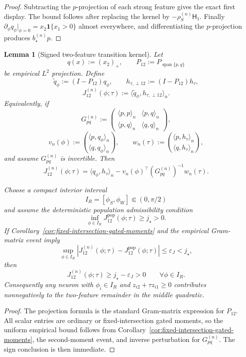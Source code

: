 \documentclass{article} %
\theoremstyle{plain}
\newtheorem{lemma}[theorem]{Lemma}
\theoremstyle{definition}
\theoremstyle{remark}
\begin{document}
\begin{proof}
Subtracting the $p$-projection of each strong feature gives the exact first
display.  The bound follows after replacing the kernel by
$-\rho_S^{(n)}\mathsf H_1$.  Finally
$\partial_\phi q_\phi|_{\phi=0}=x_2\mathbf 1\{x_1>0\}$ almost everywhere,
and differentiating the $p$-projection produces $b_\star^{(n)}p$.
\end{proof}

\begin{lemma}[Signed two-feature transition kernel]
\label{lem:signed-two-feature-transition-kernel}
Let
\[
q(x):=(x_2)_+,
\qquad
P_{12}:=P_{\operatorname{span}\{p,q\}}
\]
be empirical $L^2$ projection.  Define
\[
\widetilde q_\phi:=(I-P_{12})q_\phi,
\qquad
h_{\tau,\perp12}:=(I-P_{12})h_\tau,
\]
\[
\boxed{
J_{12}^{(n)}(\phi;\tau)
:=
\langle\widetilde q_\phi,h_{\tau,\perp12}\rangle_n.
}
\tag{J12-emp}\label{eq:J12-emp}
\]
Equivalently, if
\[
G_{pq}^{(n)}
:=
\begin{pmatrix}
\langle p,p\rangle_n&\langle p,q\rangle_n\\
\langle p,q\rangle_n&\langle q,q\rangle_n
\end{pmatrix},
\]
\[
v_n(\phi)
:=
\binom{\langle p,q_\phi\rangle_n}{\langle q,q_\phi\rangle_n},
\qquad
w_n(\tau)
:=
\binom{\langle p,h_\tau\rangle_n}{\langle q,h_\tau\rangle_n},
\]
and assume $G_{pq}^{(n)}$ is invertible. Then
\[
\boxed{
J_{12}^{(n)}(\phi;\tau)
=
\langle q_\phi,h_\tau\rangle_n
-v_n(\phi)^\top(G_{pq}^{(n)})^{-1}w_n(\tau).
}
\tag{J12-moment-form}\label{eq:J12-moment-form}
\]

Choose a compact interior interval
\[
I_R=[\phi_S,\phi_W]\Subset(0,\pi/2)
\]
and assume the deterministic population admissibility condition
\[
\boxed{
\inf_{\phi\in I_R}
J_{12}^{\mathrm{pop}}(\phi;\tau)
\ge j_\star>0.
}
\tag{J-adm}\label{eq:J-adm}
\]
If Corollary~\ref{cor:fixed-intersection-gated-moments} and the empirical
Gram-matrix event imply
\[
\sup_{\phi\in I_R}
|J_{12}^{(n)}(\phi;\tau)-J_{12}^{\mathrm{pop}}(\phi;\tau)|
\le\varepsilon_J<j_\star,
\]
then
\[
\boxed{
J_{12}^{(n)}(\phi;\tau)\ge j_\star-\varepsilon_J>0
\qquad
\forall\phi\in I_R.
}
\tag{J12-positive}\label{eq:J12-positive}
\]
Consequently any neuron with
$\phi_i\in I_R$ and $z_{i2}+\tau z_{i1}\ge0$ contributes nonnegatively to
the two-feature remainder in the middle quadratic.
\end{lemma}

\begin{proof}
The projection formula is the standard Gram-matrix expression for
$P_{12}$.  All scalar entries are ordinary or fixed-intersection gated
moments, so the uniform empirical bound follows from
Corollary~\ref{cor:fixed-intersection-gated-moments}, the second-moment event,
and inverse perturbation for $G_{pq}^{(n)}$.  The sign conclusion is then
immediate.
\end{proof}
\end{document}

